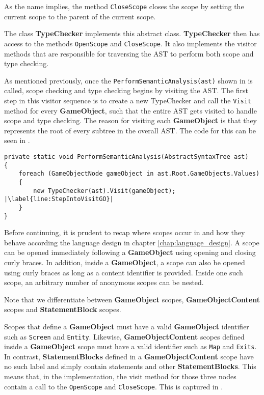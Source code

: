 As the name implies, the method \texttt{CloseScope} closes the scope by setting the current scope to the parent of the current scope. 


The class \textbf{TypeChecker} implements this abstract class. \textbf{TypeChecker} then has access to the methods \texttt{OpenScope} and \texttt{CloseScope}. It also implements the visitor methods that are responsible for traversing the AST to perform both scope and type checking.

As mentioned previously, once the \texttt{PerformSemanticAnalysis(ast)} shown in  is called, scope checking and type checking begins by visiting the AST. The first step in this visitor sequence is to create a new TypeChecker and call the \texttt{Visit} method for every \textbf{GameObject}, such that the entire AST gets visited to handle scope and type checking. The reason for visiting each \textbf{GameObject} is that they represents the root of every subtree in the overall AST. The code for this can be seen in .

\begin{lstlisting}[language=CSharp, caption={Typechecker object for every GameObject}, label={lst:TypeCheckEachGO},escapechar=|]
private static void PerformSemanticAnalysis(AbstractSyntaxTree ast)
{
    foreach (GameObjectNode gameObject in ast.Root.GameObjects.Values)
    {
        new TypeChecker(ast).Visit(gameObject); |\label{line:StepIntoVisitGO}|
    }
}
\end{lstlisting}

Before continuing, it is prudent to recap where scopes occur in \dazel{} and how they behave according the language design in chapter \ref{chap:language_design}. A scope can be opened immediately following a \textbf{GameObject} using opening and closing curly braces. In addition, inside a \textbf{GameObject}, a scope can also be opened using curly braces as long as a content identifier is provided. Inside one such scope, an arbitrary number of anonymous scopes can be nested. 

Note that we differentiate between \textbf{GameObject} scopes, \textbf{GameObjectContent} scopes and \textbf{StatementBlock} scopes.

Scopes that define a \textbf{GameObject} must have a valid \textbf{GameObject} identifier such as \texttt{Screen} and \texttt{Entity}. 
Likewise, \textbf{GameObjectContent} scopes defined inside a \textbf{GameObject} scope must have a valid identifier such as \texttt{Map} and \texttt{Exits}. In contrast, \textbf{StatementBlocks} defined in a \textbf{GameObjectContent} scope have no such label and simply contain statements and other \textbf{StatementBlocks}. 
This means that, in the implementation, the visit method for those three nodes contain a call to the \texttt{OpenScope} and \texttt{CloseScope}. This is captured in .

